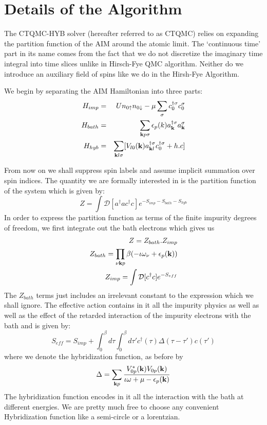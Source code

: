 \documentclass[10pt]{ruthesis}
\begin{document}
\section{Details of the Algorithm}

The CTQMC-HYB solver (hereafter referred to as CTQMC) relies on expanding the partition function of the AIM around the atomic limit. The `continuous time' part in its name comes from the fact that we do not discretize the imaginary time integral into time slices unlike in Hirsch-Fye QMC algorithm. Neither do we introduce an  auxiliary field of spins like we do in the Hirsh-Fye Algorithm. 

We begin by separating the AIM Hamiltonian into three parts:
\begin{eqnarray}
 H_{imp}&=&Un_{0\uparrow}n_{0\downarrow}-\mu\sum_{\sigma}c^{\dagger \sigma}_{0}c^{\sigma}_{0}\\
H_{bath}&=&\sum_{\mathbf{k} p\sigma} \epsilon_{p}(k)a^{\dagger\sigma}_{\mathbf{k}}a^{\sigma}_{\mathbf{k}}\\
H_{hyb}&=&\sum_{\mathbf{k} l\sigma}[V_{l0}(\mathbf{k})a^{\dagger\sigma}_{\mathbf{k} l}c^{\dagger\sigma}_{0} +h.c]
\end{eqnarray}
 
 From now on we shall suppress spin labels and assume implicit summation over spin indices. The quantity we are formally interested in is the partition function of the system which is given by:
 \begin{equation}
 Z=\int \mathcal{D}[a^{\dagger}ac^{\dagger}c] e^{-S_{imp}-S_{bath}-S_{hyb}}
\end{equation}
In order to express the partition function as terms of the finite impurity degrees of freedom, we first integrate out the bath electrons which gives us
\begin{eqnarray}
Z=Z_{bath}.Z_{imp}\\
Z_{bath}=\prod_{\nu \mathbf{k} p} \beta(-\iota\omega_{\nu} +\epsilon_{p}(\mathbf{k}))\\
Z_{imp}=\int\mathcal{D}[c^{\dagger}c] e^{-S_{eff}}
\end{eqnarray}
The $Z_{bath}$ terms just includes an irrelevant constant to the expression which we shall ignore. The effective action contains in it all the impurity physics as well as well as the effect of the retarded interaction of the impurity electrons with the bath and is given by:
\begin{equation}
S_{eff}=S_{imp}+\int_{0}^{\beta}d\tau\int_{0}^{\beta}d\tau' c^{\dagger}(\tau)\Delta(\tau-\tau')c(\tau')
\end{equation}
 where we denote the hybridization function, as before by
 \begin{equation}
 \Delta= \sum_{\mathbf{k} p}\dfrac{V_{0p}^{*}(\mathbf{k})V_{0p}(\mathbf{k})}{\iota\omega+\mu-\epsilon_{p}(\mathbf{k})}
 \end{equation}
The hybridization function encodes in it all the interaction with the bath at different energies. We are pretty much free to choose any convenient Hybridization function like a semi-circle or a lorentzian.
\end{document}
